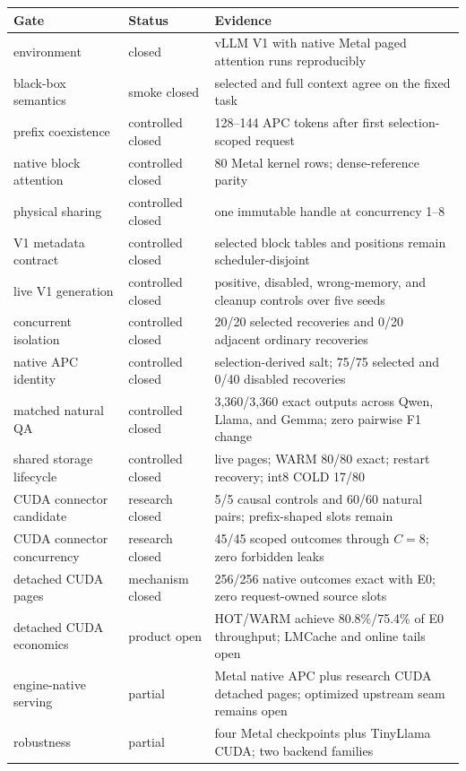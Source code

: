 \documentclass[10pt]{article}
\begin{document}
\begin{center}
\scriptsize
\begin{tabularx}{0.96\linewidth}{l l Y}
\toprule
Gate & Status & Evidence \\
\midrule
environment & closed & vLLM V1 with native Metal paged attention runs reproducibly \\
black-box semantics & smoke closed & selected and full context agree on the fixed task \\
prefix coexistence & controlled closed & 128--144 APC tokens after first selection-scoped request \\
native block attention & controlled closed & 80 Metal kernel rows; dense-reference parity \\
physical sharing & controlled closed & one immutable handle at concurrency 1--8 \\
V1 metadata contract & controlled closed & selected block tables and positions remain scheduler-disjoint \\
live V1 generation & controlled closed & positive, disabled, wrong-memory, and cleanup controls over five seeds \\
concurrent isolation & controlled closed & 20/20 selected recoveries and 0/20 adjacent ordinary recoveries \\
native APC identity & controlled closed & selection-derived salt; 75/75 selected and 0/40 disabled recoveries \\
matched natural QA & controlled closed & 3,360/3,360 exact outputs across Qwen, Llama, and Gemma; zero pairwise F1 change \\
shared storage lifecycle & controlled closed & live pages; WARM 80/80 exact; restart recovery; int8 COLD 17/80 \\
CUDA connector candidate & research closed & 5/5 causal controls and 60/60 natural pairs; prefix-shaped slots remain \\
CUDA connector concurrency & research closed & 45/45 scoped outcomes through $C=8$; zero forbidden leaks \\
detached CUDA pages & mechanism closed & 256/256 native outcomes exact with E0; zero request-owned source slots \\
detached CUDA economics & product open & HOT/WARM achieve 80.8\%/75.4\% of E0 throughput; LMCache and online tails open \\
engine-native serving & partial & Metal native APC plus research CUDA detached pages; optimized upstream seam remains open \\
robustness & partial & four Metal checkpoints plus TinyLlama CUDA; two backend families \\
\bottomrule
\end{tabularx}
\end{center}
\end{document}
